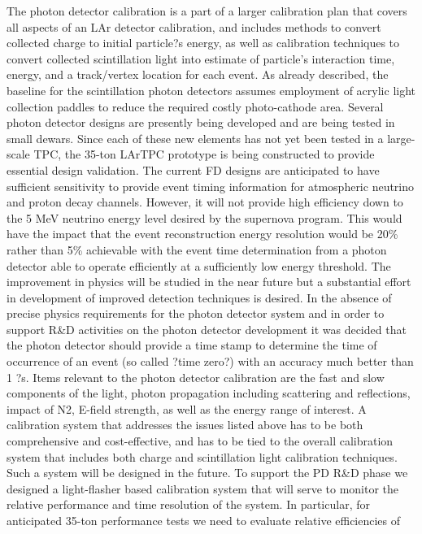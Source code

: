 The photon detector calibration is a part of a larger calibration plan
that covers all aspects of an LAr detector calibration, and includes
methods to convert collected charge to initial particle?s energy, as
well as calibration techniques to convert collected scintillation
light into estimate of particle's interaction time, energy, and a
track/vertex location for each event.  As already described, the
baseline for the scintillation photon detectors assumes employment of
acrylic light collection paddles to reduce the required costly
photo-cathode area. Several photon detector designs are presently
being developed and are being tested in small dewars. Since each of
these new elements has not yet been tested in a large-scale TPC, the
35-ton LArTPC prototype is being constructed to provide essential
design validation. The current FD designs are anticipated to have
sufficient sensitivity to provide event timing information for
atmospheric neutrino and proton decay channels. However, it will not
provide high efficiency down to the 5 MeV neutrino energy level
desired by the supernova program. This would have the impact that the
event reconstruction energy resolution would be 20\% rather than 5\%
achievable with the event time determination from a photon detector
able to operate efficiently at a sufficiently low energy
threshold. The improvement in physics will be studied in the near
future but a substantial effort in development of improved detection
techniques is desired. In the absence of precise physics requirements
for the photon detector system and in order to support R\&D activities
on the photon detector development it was decided that the photon
detector should provide a time stamp to determine the time of
occurrence of an event (so called ?time zero?) with an accuracy much
better than 1 ?s.  Items relevant to the photon detector calibration
are the fast and slow components of the light, photon propagation
including scattering and reflections, impact of N2, E-field strength,
as well as the energy range of interest. A calibration system that
addresses the issues listed above has to be both comprehensive and
cost-effective, and has to be tied to the overall calibration system
that includes both charge and scintillation light calibration
techniques. Such a system will be designed in the future.  To support
the PD R\&D phase we designed a light-flasher based calibration system
that will serve to monitor the relative performance and time
resolution of the system. In particular, for anticipated 35-ton
performance tests we need to evaluate relative efficiencies of
